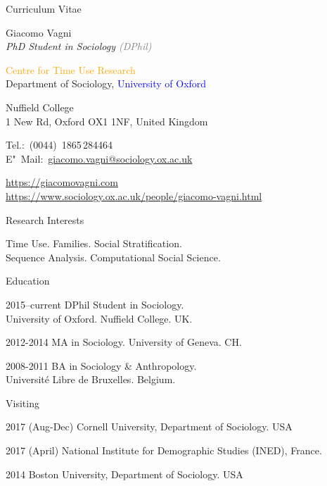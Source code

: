 \documentclass[12pt,a4paper]{article}
\begin{document}
\begin{cv}{Curriculum Vitae}
  \begin{cvlist}{}
  \item \colorbox{mygray} {Giacomo Vagni}\\
  \emph{PhD Student in Sociology \textcolor{Gray}{(DPhil)}}
  
    \textcolor{Orange} {Centre for Time Use Research} \\
     Department of Sociology, \textcolor{Blue}{University of Oxford} 
    \item Nuffield College \\ 
    1 New Rd, Oxford OX1 1NF, United Kingdom
  \item Tel.:~(0044)~1865\,284464\\
    E"~Mail:~\href{mailto:giacomo.vagni@sociology.ox.ac.uk}{giacomo.vagni@sociology.ox.ac.uk}
    
    \item \href{https://giacomovagni.com} {https://giacomovagni.com} \\ 
     \href{https://www.sociology.ox.ac.uk/people/giacomo-vagni.html} {https://www.sociology.ox.ac.uk/people/giacomo-vagni.html} \\
    
  \end{cvlist}
  
  \begin{cvlist}{Research Interests}
  \item[] Time Use. Families. Social Stratification. \\  Sequence Analysis. Computational Social Science. 
  \end{cvlist}
  
  \begin{cvlist}{Education}
  \item[2015--current] DPhil Student in Sociology. \\ University of Oxford. Nuffield College. UK. 
  \item[2012-2014] MA in Sociology. University of Geneva. CH. 
  \item[2008-2011] BA in Sociology \& Anthropology. \\ Universit{\'e} Libre de Bruxelles. Belgium. 
  \end{cvlist}
  
      \begin{cvlist}{Visiting}
      	\item[2017 (Aug-Dec)] Cornell University, Department of Sociology. USA 
      	\item[2017 (April)] National Institute for Demographic Studies (INED), France. 
      	\item[2014] Boston University, Department of Sociology. USA
      \end{cvlist}
      

\end{cv}
\end{document}
